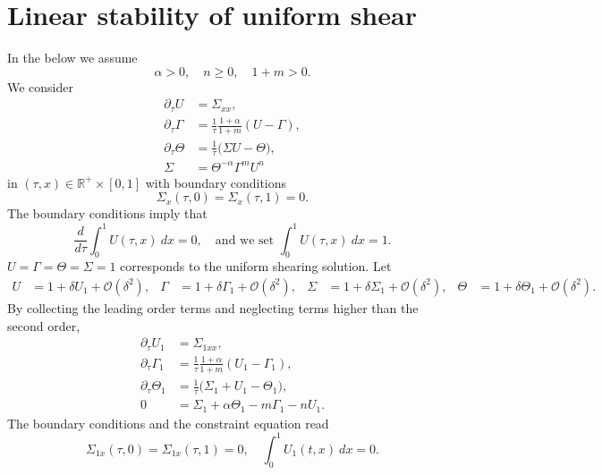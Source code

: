 \documentclass[a4paper,11pt]{article}
\theoremstyle{remark}
\begin{document}
\section{Linear stability of uniform shear}
In the below we assume 
$$ \alpha>0, \quad n\ge0, \quad 1+m>0.$$
We consider
\begin{equation} \label{eq:system}
 \begin{aligned}
  \partial_\tau U &= \Sigma_{xx},\\
  \partial_\tau\Gamma &= \frac{1}{\tau}\frac{1+\alpha}{1+m}(U-\Gamma),\\
  \partial_\tau\Theta &= \frac{1}{\tau}\Big(\Sigma U -\Theta\Big),\\
  \Sigma &= \Theta^{-\alpha}\Gamma^m U^n
 \end{aligned}
\end{equation}
in $(\tau,x)\in \mathbb{R}^+\times [0,1]$ with boundary conditions
\begin{equation}
 \Sigma_x(\tau,0)=\Sigma_x(\tau,1)=0.
\end{equation}
The boundary conditions imply that 
\begin{equation}
 \frac{d}{d\tau}\int_0^1 U(\tau,x) \: dx = 0, \quad \text{and we set } \int_0^1 U(\tau,x) \: dx = 1.
\end{equation}
$ U=\Gamma=\Theta=\Sigma=1 $ corresponds to the uniform shearing solution.
Let 
\begin{align*}
 U &= 1 + \delta U_1 + \mathcal{O}(\delta^2), & \Gamma &= 1 + \delta \Gamma_1 + \mathcal{O}(\delta^2), &
 \Sigma &= 1 + \delta \Sigma_1 + \mathcal{O}(\delta^2), & \Theta &= 1 + \delta \Theta_1 + \mathcal{O}(\delta^2).
\end{align*}
By collecting the leading order terms and neglecting terms higher than the  second order,
\begin{equation} \label{eq:linsystem}
 \begin{aligned}
  \partial_\tau U_1 &= \Sigma_{1xx},\\
  \partial_\tau\Gamma_1 &= \frac{1}{\tau}\frac{1+\alpha}{1+m}(U_1-\Gamma_1),\\
  \partial_\tau\Theta_1 &= \frac{1}{\tau}\Big(\Sigma_1+ U_1 -\Theta_1\Big),\\
  0&=\Sigma_1 + \alpha\Theta_1 -m\Gamma_1 - nU_1 .
 \end{aligned}
\end{equation}
The boundary conditions and the constraint equation read
\begin{equation} \label{eq:linbdry}
 \Sigma_{1x}(\tau,0)=\Sigma_{1x}(\tau,1)=0, \quad \int_0^1 U_1(t,x) \: dx = 0.
\end{equation}
\end{document}
